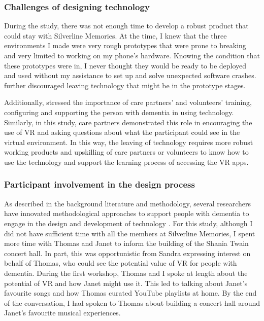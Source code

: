 \subsubsection{Challenges of designing technology}
\label{S1:Robustness}
During the study, there was not enough time to develop a robust product that could stay with Silverline Memories. At the time, I knew that the three environments I made were very rough prototypes that were prone to breaking and very limited to working on my phone's hardware. Knowing the condition that these prototypes were in, I never thought they would be ready to be deployed and used without my assistance to set up and solve unexpected software crashes. \cite{hwang2020exploring} further discouraged leaving technology that might be in the prototype stages.

Additionally, \cite{hwang2020exploring} stressed the importance of care partners' and volunteers' training, configuring and supporting the person with dementia in using technology. Similarly, in this study, care partners demonstrated this role in encouraging the use of VR and asking questions about what the participant could see in the virtual environment. In this way, the leaving of technology requires more robust working products and upskilling of care partners or volunteers to know how to use the technology and support the learning process of accessing the VR apps. 

\subsubsection{Participant involvement in the design process}
\label{WhatExtentCo-design}
As described in the background literature and methodology, several researchers have innovated methodological approaches to support people with dementia to engage in the design and development of technology \citep{hendriks_challenges_2014, wallace_enabling_2012-1,lazar_critical_2017}. For this study, although I did not have sufficient time with all the members at Silverline Memories, I spent more time with Thomas and Janet to inform the building of the Shania Twain concert hall. In part, this was opportunistic from Sandra expressing interest on behalf of Thomas, who could see the potential value of VR for people with dementia. During the first workshop, Thomas and I spoke at length about the potential of VR and how Janet might use it. This led to talking about Janet's favourite songs and how Thomas curated YouTube playlists at home. By the end of the conversation, I had spoken to Thomas about building a concert hall around Janet's favourite musical experiences.

